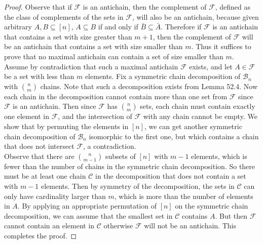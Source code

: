 \documentclass{article}
\begin{document}
\begin{enumerate}
\begin{enumerate}
        \begin{proof}
          Observe that if $\mathcal{F}$ is an antichain, then the
          complement of $\mathcal{F}$, defined as the class of complements
          of the sets in $\mathcal{F}$, will also be an antichain, because
          given arbitrary $A,B\subseteq[n]$, $A\subseteq B$ if and only if
          $\bar{B}\subseteq\bar{A}$. Therefore if $\mathcal{F}$ is an
          antichain that contains a set with size greater than $m+1$, then
          the complement of $\mathcal{F}$ will be an antichain that
          contains a set with size smaller than $m$. Thus it suffices to
          prove that no maximal antichain can contain a set of size smaller
          than $m$. \\

          Assume by contradiction that such a maximal antichain
          $\mathcal{F}$ exists, and let $A\in\mathcal{F}$ be a set with
          less than $m$ elements. Fix a symmetric chain decomposition of
          $\mathcal{B}_n$ with $\binom{n}{m}$ chains. Note that such a
          decomposition exists from Lemma 52.4. Now each chain in the
          decomposition cannot contain more than one set from $\mathcal{F}$
          since $\mathcal{F}$ is an antichain. Then since $\mathcal{F}$ has
          $\binom{n}{m}$ sets, each chain must contain exactly one element
          in $\mathcal{F}$, and the intersection of $\mathcal{F}$ with any
          chain cannot be empty. We show that by permuting the elements in
          $[n]$, we can get another symmetric chain decomposition of
          $\mathcal{B}_n$ isomorphic to the first one, but which contains a
          chain that does not intersect $\mathcal{F}$, a contradiction. \\

          Observe that there are $\binom{n}{m-1}$ subsets of $[n]$ with
          $m-1$ elements, which is fewer than the number of chains in the
          symmetric chain decomposition. So there must be at least one
          chain $\mathcal{C}$ in the decomposition that does not contain a
          set with $m-1$ elements. Then by symmetry of the decomposition,
          the sets in $\mathcal{C}$ can only have cardinality
          larger than $m$, which is more than the number of elements in
          $A$. By applying an appropriate permutation of $[n]$ on the
          symmetric chain decomposition, we can assume that the smallest
          set in $\mathcal{C}$ contains $A$. But then $\mathcal{F}$ cannot
          contain an element in $\mathcal{C}$ otherwise $\mathcal{F}$ will
          not be an antichain. This completes the proof.
        \end{proof}


\end{enumerate}
\end{enumerate}
\end{document}
